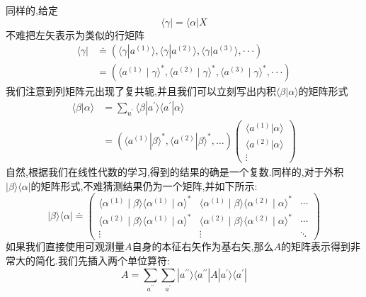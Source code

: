 \documentclass[lang=cn,newtx,10pt,scheme=chinese,thmcnt=section]{elegantbook}
\begin{document}
同样的,给定
\begin{equation}
	\langle\gamma|=\langle\alpha|X
\end{equation}
不难把左矢表示为类似的行矩阵
\begin{equation}
	\begin{aligned}\langle\gamma|&\doteq(\langle\gamma|a^{(1)}\rangle,\langle\gamma|a^{(2)}\rangle,\langle\gamma|a^{(3)}\rangle,\cdotp\cdotp\cdotp)\\&=(\langle a^{(1)}\mid\gamma\rangle^*,\langle a^{(2)}\mid\gamma\rangle^*,\langle a^{(3)}\mid\gamma\rangle^*,\cdotp\cdotp\cdotp)\end{aligned}
\end{equation}
我们注意到列矩阵元出现了复共轭,并且我们可以立刻写出内积$\langle\beta|\alpha\rangle$的矩阵形式
\begin{equation}
	\begin{aligned}
		\langle\beta|\alpha\rangle
		&=\sum_{{u^{\prime}}}\langle\beta|a^{\prime}\rangle\langle a^{\prime}|\alpha\rangle\\
		&=(\langle a^{(1)}|\beta\rangle^{*},\langle a^{(2)}|\beta\rangle^{*},\ldots)
		\begin{pmatrix}
			\langle a^{(1)}|\alpha\rangle\\
			\langle a^{(2)}|\alpha\rangle\\
			\vdots
		\end{pmatrix}
	\end{aligned}
\end{equation}
自然,根据我们在线性代数的学习,得到的结果的确是一个复数.同样的,对于外积$|\beta\rangle\langle\alpha|$的矩阵形式,不难猜测结果仍为一个矩阵,并如下所示:
\begin{equation}
	|\beta\rangle\langle\alpha|\doteq
	\begin{pmatrix}
		\langle\alpha^{(1)}\mid\beta\rangle\langle\alpha^{(1)}\mid\alpha\rangle^*&\langle\alpha^{(1)}\mid\beta\rangle\langle\alpha^{(2)}\mid\alpha\rangle^*&\cdots\\\langle\alpha^{(2)}\mid\beta\rangle\langle\alpha^{(1)}\mid\alpha\rangle^*&\langle\alpha^{(2)}\mid\beta\rangle\langle\alpha^{(2)}\mid\alpha\rangle^*&\cdots\\\vdots&\vdots&\ddots
	\end{pmatrix}
\end{equation}
如果我们直接使用可观测量$A$自身的本征右矢作为基右矢,那么$A$的矩阵表示得到非常大的简化.我们先插入两个单位算符:
\begin{equation}
	A=\sum_{a^{\prime\prime}}\sum_{a^{\prime}}|a^{\prime\prime}\rangle\langle a^{\prime\prime}|A|a^{\prime}\rangle\langle a^{\prime}|
\end{equation}
\end{document}
